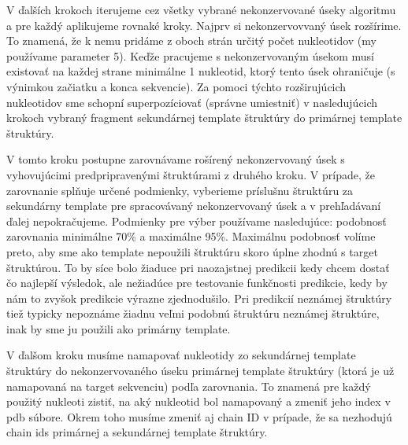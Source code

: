 \indent V ďalších krokoch iterujeme cez všetky vybrané nekonzervované úseky algoritmu a pre každý aplikujeme rovnaké kroky. Najprv si nekonzervovvaný úsek rozšírime. To znamená, že k nemu pridáme z oboch strán určitý počet nukleotidov (my používame parameter 5). Keďže pracujeme s nekonzervovaným úsekom musí existovať na každej strane minimálne 1 nukleotid, ktorý tento úsek ohraničuje (s výnimkou začiatku a konca sekvencie). Za pomoci týchto rozširujúcich nukleotidov sme schopní superpozíciovať (správne umiestniť) v nasledujúcich krokoch vybraný fragment sekundárnej template štruktúry do primárnej template štruktúry.


\indent V tomto kroku postupne zarovnávame rošírený nekonzervovaný úsek s vyhovujúcimi predpripravenými štruktúrami z druhého kroku. V prípade, že zarovnanie splňuje určené podmienky, vyberieme príslušnu štruktúru za sekundárny template  pre spracovávaný nekonzervovaný úsek a v prehľadávaní ďalej nepokračujeme. Podmienky pre výber používame nasledujúce: podobnosť zarovnania minimálne 70\% a maximálne 95\%. Maximálnu podobnosť volíme preto, aby sme ako template nepoužili štruktúru skoro úplne zhodnú s target štruktúrou. To by síce bolo žiaduce pri naozajstnej predikcii kedy chcem dostať čo najlepší výsledok, ale nežiadúce pre testovanie funkčnosti predikcie, kedy by nám to zvyšok predikcie výrazne zjednodušilo. Pri predikcií neznámej štruktúry tiež typicky nepoznáme žiadnu veľmi podobnú štruktúru neznámej štruktúre, inak by sme ju použili ako primárny template. 


\indent V ďalšom kroku musíme namapovať nukleotidy zo sekundárnej template štruktúry do nekonzervovaného úseku primárnej template štruktúry (ktorá je už namapovaná na target sekvenciu) podľa zarovnania. To znamená pre každý použitý nukleoti zistiť, na aký nukleotid bol namapovaný a zmeniť jeho index v pdb súbore. Okrem toho musíme zmeniť aj chain ID v prípade, že sa nezhodujú chain ids primárnej a sekundárnej template štruktúry.


